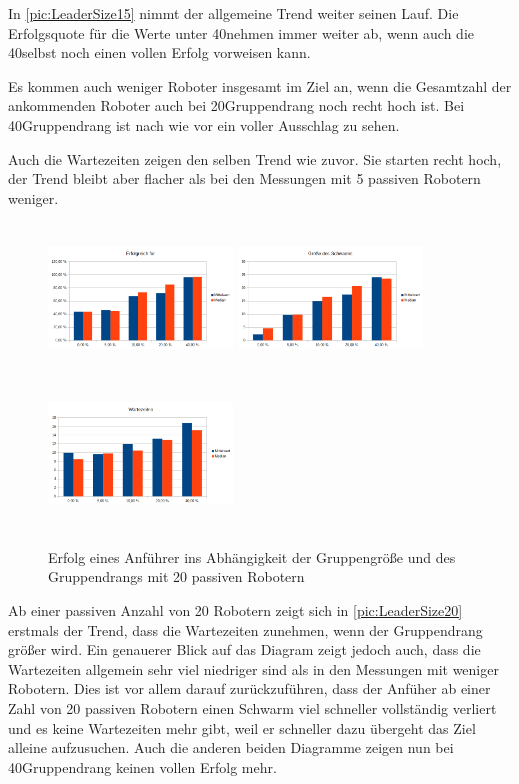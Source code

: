 In \autoref{pic:LeaderSize15} nimmt der allgemeine Trend weiter seinen Lauf. Die Erfolgsquote für die Werte unter 40\per nehmen immer weiter ab, wenn auch die 40\per selbst noch einen vollen Erfolg vorweisen kann.

Es kommen auch weniger Roboter insgesamt im Ziel an, wenn die Gesamtzahl der ankommenden Roboter auch bei 20\per Gruppendrang noch recht hoch ist. Bei 40\per Gruppendrang ist nach wie vor ein voller Ausschlag zu sehen.

Auch die Wartezeiten zeigen den selben Trend wie zuvor. Sie starten recht hoch, der Trend bleibt aber flacher als bei den Messungen mit 5 passiven Robotern weniger.

\begin{figure}
	\includegraphics[width=4.9cm, height=4cm]{graphics/Statistics/Leader/FlockSize/20_1.png}
	\includegraphics[width=4.9cm, height=4cm]{graphics/Statistics/Leader/FlockSize/20_2.png}
	\includegraphics[width=4.9cm, height=4cm]{graphics/Statistics/Leader/FlockSize/20_3.png}
	\caption{Erfolg eines Anführer ins Abhängigkeit der Gruppengröße und des Gruppendrangs mit 20 passiven Robotern}
	\label{pic:LeaderSize20}
\end{figure}

Ab einer passiven Anzahl von 20 Robotern zeigt sich in \autoref{pic:LeaderSize20} erstmals der Trend, dass die Wartezeiten zunehmen, wenn der Gruppendrang größer wird. Ein genauerer Blick auf das Diagram zeigt jedoch auch, dass die Wartezeiten allgemein sehr viel niedriger sind als in den Messungen mit weniger Robotern. Dies ist vor allem darauf zurückzuführen, dass der Anfüher ab einer Zahl von 20 passiven Robotern einen Schwarm viel schneller vollständig verliert und es keine Wartezeiten mehr gibt, weil er schneller dazu übergeht das Ziel alleine aufzusuchen. Auch die anderen beiden Diagramme zeigen nun bei 40\per Gruppendrang keinen vollen Erfolg mehr.

